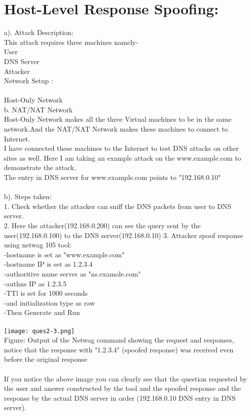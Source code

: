 \documentclass{article}
\begin{document}
\section{Host-Level Response Spoofing:}
a). Attack Description:
\\
This attack requires three machines namely-
\\User\\DNS Server\\Attacker\\
Network Setup :\\
\\ Host-Only Network
\\b. NAT/NAT Network\\
Host-Only Network makes all the three Virtual machines to be in the same network.And the NAT/NAT Network makes these machines to connect to Internet.\\
I have connected these machines to the Internet to test DNS attacks on other sites as well. Here I am taking an example attack on the www.example.com to demonstrate the attack.\\
The entry in DNS server for www.example.com points to "192.168.0.10"
\\
\\
b). Steps taken:
\\
1. Check whether the attacker can sniff the DNS packets from user to DNS server.
\\2. Here the attacker(192.168.0.200) can see the query sent by the user(192.168.0.100) to the DNS server(192.168.0.10)
3. Attacker spoof response using netwag 105 tool: 
\\
-hostname is set as "www.example.com"\\
-hostname IP is set as 1.2.3.4\\
-authoritive name server as "ns.examole.com"\\
-authns IP as 1.2.3.5\\
-TTl is set for 1000 seconds\\
-and initialization type as raw\\
-Then Generate and Run\\
\\
\texttt{[image: ques2-3.png]}
\\Figure: Output of the Netwag command showing the request and responses, notice that the response with "1.2.3.4" (spoofed response) was received even before the original response
\\  \\
If you notice the above image you can clearly see that the question requested by the user and answer constructed by the tool and the spoofed response and the response by the actual DNS server in order (192.168.0.10 DNS entry in DNS server).
\end{document}
